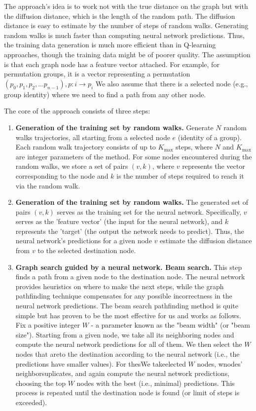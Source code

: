 \documentclass[atmp]{ipart_v1}
\numberwithin{equation}{section}
\theoremstyle{plain}%
\begin{document}
The approach's idea is to work not with the true distance on the graph but with the diffusion distance, which is the length of the random path. The diffusion distance is easy to estimate by the number of steps of random walks. Generating random walks is much faster than computing neural network predictions. Thus, the training data generation is much more efficient than in Q-learning approaches, though the training data might be of poorer quality. 
The assumption is that each graph node has a feature vector attached. For example, for permutation groups, it is a vector representing a permutation $(p_0,p_1,p_2,...p_{n-1}), p:i \to p_i $
We also assume that there is a selected node (e.g., group identity) where we need to find a path from any other node. 

The core of the approach consists of three steps:

\begin{enumerate}
  \item {\bf Generation of the training set by random walks.} 
  Generate $N$ random walks trajectories, all starting from a selected node $e$ (identity of a group). Each random walk trajectory consists of up to $K_{\text{max}}$ steps, where $N$ and $K_{\text{max}}$ are integer parameters of the method. For some nodes encountered during the random walks, we store a set of pairs $(v, k)$, where $v$ represents the vector corresponding to the node and $k$ is the number of steps required to reach it via the random walk. 
  \item {\bf Generation of the training set by random walks.}  The generated set of pairs $(v, k)$ serves as the training set for the neural network. Specifically, $v$ serves as the 'feature vector' (the input for the neural network), and $k$ represents the 'target' (the output the network needs to predict). Thus, the neural network's predictions for a given node $v$ estimate the diffusion distance from $v$ to the selected destination node.
  \item {\bf Graph search guided by a neural network. Beam search.} This step finds a path from a given node to the destination node. The neural network provides heuristics on where to make the next steps, while the graph pathfinding technique compensates for any possible incorrectness in the neural network predictions. The beam search pathfinding method is quite simple but has proven to be the most effective for us and works as follows. Fix a positive integer $W$ - a parameter known as the "beam width" (or "beam size"). 
  Starting from a given node, we take all its neighboring nodes and compute the neural network predictions for all of them. We then select the $W$ nodes that areto the destination according to the neural network (i.e., the predictions have smaller values). For thesWe takeelected $W$ nodes, wnodes' neighborsuplicates, and again compute the neural network predictions, choosing the top $W$ nodes with the best (i.e., minimal) predictions. This process is repeated until the destination node is found (or limit of steps is exceeded).
  
\end{enumerate}
\end{document}
